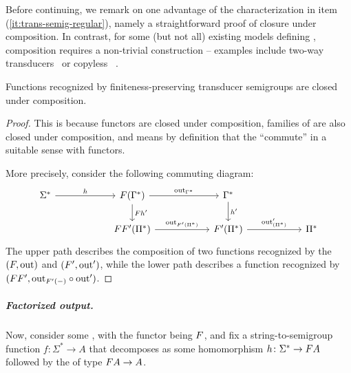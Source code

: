 Before continuing, we remark on one advantage of the characterization in item
(\ref{it:trans-semig-regular}), namely a straightforward proof of closure under
composition. In contrast, for some (but not all) existing models defining
, composition requires a non-trivial
construction -- examples include two-way transducers~\cite[Theorem 2]{ChytilJ77}
or copyless ~\cite[Theorem 1]{composingSST}.
\begin{proposition}\label{prop:composition}
  Functions recognized by finiteness-preserving transducer semigroups are closed
  under composition.
\end{proposition}
\begin{proof}
  This is because  functors are closed under composition,
   families of  are also closed under composition, and 
  means by definition that the  \enquote{commute} in a suitable
  sense with functors.

  More precisely, consider the following commuting  diagram:
    \[
      \begin{tikzcd}[ampersand replacement=\&, column sep=2cm]
        \Sigma^* 
        \ar[r,"h"]
        \& 
        \functor(\Gamma^*)
        \ar[r,"\outfun_{\Gamma^*}"]
        \ar[d,"\functor h'"]
        \&
        \Gamma^* \ar[d,"h'"]\\
        \&
        \functor\functor'(\Pi^*) \ar[r,"\outfun_{\functor'(\Pi^*)}"]
        \& 
        \functor'(\Pi^*)
        \ar[r,"\outfun'_{(\Pi^*)}"]
        \&
        \Pi^*
      \end{tikzcd}
  \]
  The upper path describes the composition of two functions recognized by the
   $(\functor,\outfun)$ and $(\functor',\outfun')$,
  while the lower path describes a function recognized by $(\functor\functor',
  \outfun_{\functor'(-)} \circ \outfun')$.
\end{proof}





\subparagraph{Factorized output.}
Now, consider some , with the functor being $\functor$, and fix a string-to-semigroup function $f\colon \Sigma^* \to A$ that decomposes as some homomorphism $h\colon \Sigma^* \to \functor A$ followed by the  of type $\functor A \to A$. 

